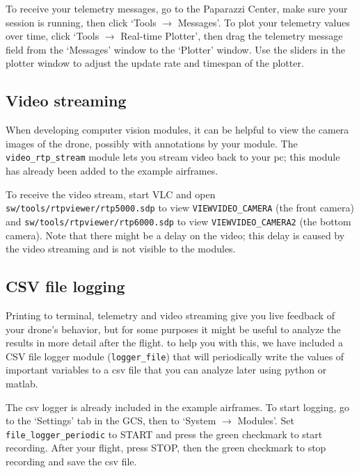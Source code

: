 \documentclass{article}
\begin{document}
To receive your telemetry messages, go to the Paparazzi Center, make sure your session is running, then click `Tools $\rightarrow$ Messages'. To plot your telemetry values over time, click `Tools $\rightarrow$ Real-time Plotter', then drag the telemetry message field from the `Messages' window to the `Plotter' window. Use the sliders in the plotter window to adjust the update rate and timespan of the plotter.


\subsection{Video streaming}
When developing computer vision modules, it can be helpful to view the camera images of the drone, possibly with annotations by your module. The \texttt{video\_rtp\_stream} module lets you stream video back to your pc; this module has already been added to the example airframes.

To receive the video stream, start VLC and open \texttt{sw/tools/rtpviewer/rtp5000.sdp} to view \texttt{VIEWVIDEO\_CAMERA} (the front camera) and \texttt{sw/tools/rtpviewer/rtp6000.sdp} to view \texttt{VIEWVIDEO\_CAMERA2} (the bottom camera). Note that there might be a delay on the video; this delay is caused by the video streaming and is not visible to the modules.


\subsection{CSV file logging}
Printing to terminal, telemetry and video streaming give you live feedback of your drone's behavior, but for some purposes it might be useful to analyze the results in more detail after the flight. to help you with this, we have included a CSV file logger module (\texttt{logger\_file}) that will periodically write the values of important variables to a csv file that you can analyze later using python or matlab.

The csv logger is already included in the example airframes. To start logging, go to the `Settings' tab in the GCS, then to `System $\rightarrow$ Modules'. Set \texttt{file\_logger\_periodic} to START and press the green checkmark to start recording. After your flight, press STOP, then the green checkmark to stop recording and save the csv file.
\end{document}
